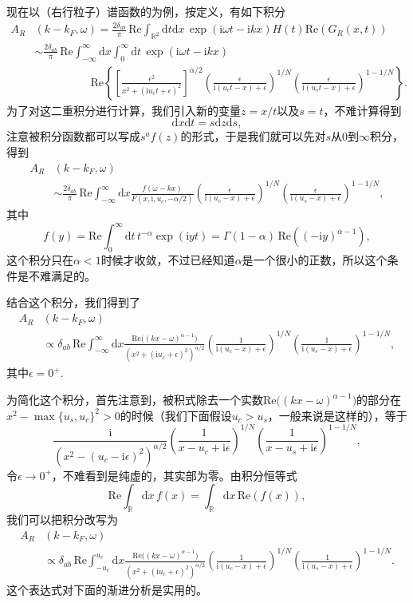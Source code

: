 \documentclass[9pt]{extarticle}
\newcommand{\ii}{\mathrm{i}}
\newcommand{\rr}{\mathbb{R}}
\newcommand{\dd}{\mathrm{d}}
\begin{document}
现在以（右行粒子）谱函数的为例，按定义，有如下积分
\begin{align*}
	A_R&(k-k_F,\omega)=\frac{2\delta_{ab}}{\pi} \, \mathrm{Re}\int_{\rr^2}\dd t\dd x\, \exp(\ii \omega t-\ii k x)H(t)\mathrm{Re}(G_R(x,t))\\
	&\sim \frac{2\delta_{ab}}{\pi}\,\mathrm{Re}\int_{-\infty}^\infty \dd x\int_{0}^\infty \dd t \,\exp(\ii \omega t-\ii k x)\\
	&\hspace{5em}\mathrm{Re}\left\{\left[\frac{\epsilon^2}{x^2+(\ii u_c t+\epsilon)^2}\right]^{\alpha/2}\left(\frac{\epsilon}{\ii(u_ct-x)+\epsilon}\right)^{1/N}\left(\frac{\epsilon}{\ii(u_st-x)+\epsilon}\right)^{1-1/N}\right\}.
\end{align*}
为了对这二重积分进行计算，我们引入新的变量$z=x/t$以及$s=t$，不难计算得到
\[
	\dd x \dd t=s\dd z\dd s,
\]
注意被积分函数都可以写成$s^a f(z)$的形式，于是我们就可以先对$s$从$0$到$\infty$积分，得到
\begin{align*}
	A_R&(k-k_F,\omega)\\
	&\sim \frac{2\delta_{ab}}{\pi}\,\mathrm{Re}\int_{-\infty}^\infty \dd x \frac{f(\omega-kx)}{F\left(x,\ii,u_c,-\alpha/2\right)}\left(\frac{\epsilon}{\ii(u_c-x)+\epsilon}\right)^{1/N}\left(\frac{\epsilon}{\ii(u_s-x)+\epsilon}\right)^{1-1/N},
\end{align*}
其中
\[
	f(y)=\mathrm{Re}\int_{0}^\infty \dd t \,t^{-\alpha} \exp(\ii y t)=\Gamma \left(1-\alpha\right)\,\mathrm{Re}\left((-\ii y)^{\alpha-1}\right),
\]
这个积分只在$\alpha<1$时候才收敛，不过已经知道$\alpha$是一个很小的正数，所以这个条件是不难满足的。

结合这个积分，我们得到了
\begin{align*}
	A_R&(k-k_F,\omega)\\
	&\propto \delta_{ab}\,\mathrm{Re}\int_{-\infty}^\infty \dd x \frac{\mathrm{Re}\bigl((kx-\omega)^{\alpha-1}\bigr)}{(x^2+(\ii u_c+\epsilon)^2)^{\alpha/2}}\left(\frac{1}{\ii(u_c-x)+\epsilon}\right)^{1/N}\left(\frac{1}{\ii(u_s-x)+\epsilon}\right)^{1-1/N},
\end{align*}
其中$\epsilon=0^+$. 

为简化这个积分，首先注意到，被积式除去一个实数$\mathrm{Re}\bigl((kx-\omega)^{\alpha-1}\bigr)$的部分在$x^2-\max\{u_s,u_c\}^2>0$的时候（我们下面假设$u_c>u_s$，一般来说是这样的），等于
\[
	\frac{\ii}{(x^2-(u_c-\ii\epsilon)^2)^{\alpha/2}}\left(\frac{1}{x-u_c+\ii\epsilon}\right)^{1/N}\left(\frac{1}{x-u_s+\ii\epsilon}\right)^{1-1/N},
\]
令$\epsilon\to 0^+$，不难看到是纯虚的，其实部为零。由积分恒等式
\[
	\mathrm{Re}\int_\rr \dd x \,f(x)=\int_\rr \dd x \, \mathrm{Re}(f(x)),
\]
我们可以把积分改写为
\begin{align*}
	A_R&(k-k_F,\omega)\\
	&\propto \delta_{ab}\,\mathrm{Re}\int_{-u_c}^{u_c} \dd x \frac{\mathrm{Re}\bigl((kx-\omega)^{\alpha-1}\bigr)}{(x^2+(\ii u_c+\epsilon)^2)^{\alpha/2}}\left(\frac{1}{\ii(u_c-x)+\epsilon}\right)^{1/N}\left(\frac{1}{\ii(u_s-x)+\epsilon}\right)^{1-1/N}.
\end{align*}
这个表达式对下面的渐进分析是实用的。
\end{document}
